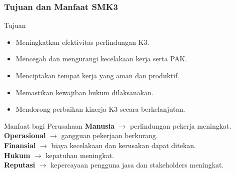\documentclass[../main.tex]{subfiles}
\begin{document}
\begin{frame}[mytitle=standard,t,mycolor=white]
	\frametitle{Tujuan dan Manfaat SMK3}

	\begin{block}{Tujuan}
		\begin{itemize}
			\item Meningkatkan efektivitas perlindungan K3.
			\item Mencegah dan mengurangi kecelakaan kerja serta PAK.
			\item Menciptakan tempat kerja yang aman dan produktif.
			\item Memastikan kewajiban hukum dilaksanakan.
			\item Mendorong perbaikan kinerja K3 secara berkelanjutan.
		\end{itemize}
	\end{block}

	\begin{block}{Manfaat bagi Perusahaan}
		\textbf{Manusia} $\rightarrow$ perlindungan pekerja meningkat.\\
		\textbf{Operasional} $\rightarrow$ gangguan pekerjaan berkurang.\\
		\textbf{Finansial} $\rightarrow$ biaya kecelakaan dan kerusakan dapat ditekan.\\
		\textbf{Hukum} $\rightarrow$ kepatuhan meningkat.\\
		\textbf{Reputasi} $\rightarrow$ kepercayaan pengguna jasa dan stakeholders meningkat.
	\end{block}
\end{frame}
\end{document}
